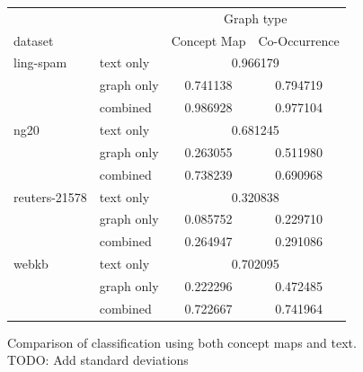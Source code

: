
\begin{figure}[ht]
\centering
\begin{tabular}{llcc}
  &  & \multicolumn{2}{c}{Graph type} \\
   dataset   & &  Concept Map &  Co-Occurrence \\
\midrule
ling-spam 
          & text only & \multicolumn{2}{c}{ 0.966179 }\\
          & graph only &  0.741138 &  0.794719\\
          & combined &  0.986928 &  0.977104\\
\midrule
ng20 
          & text only & \multicolumn{2}{c}{ 0.681245 }\\
          & graph only &  0.263055 &  0.511980\\
          & combined &  0.738239 &  0.690968\\
\midrule
reuters-21578 
          & text only & \multicolumn{2}{c}{ 0.320838 }\\
          & graph only &  0.085752 &  0.229710\\
          & combined &  0.264947 &  0.291086\\
\midrule
webkb 
          & text only & \multicolumn{2}{c}{ 0.702095 }\\
          & graph only &  0.222296 &  0.472485\\
          & combined &  0.722667 &  0.741964\\
\bottomrule
\end{tabular}
\caption{Comparison of classification using both concept maps and text. TODO: Add standard deviations}%
\label{fig:results_comparison_combined}
\end{figure}

